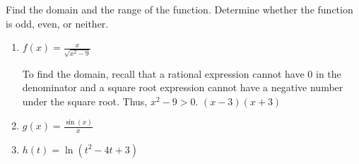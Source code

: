 \documentclass[nooutcomes, noinstructornotes]{ximera}
\begin{document}
\begin{problem}
Find the domain and the range of the function.  Determine whether the function is odd, even, or neither.

\begin{enumerate}
	\item $f(x)=\frac{x}{\sqrt{x^2-9}}$
		\begin{freeResponse}
			To find the domain, recall that a rational expression cannot have $0$ in the denominator and a square root expression cannot have a negative number under the square root.  Thus, $x^2-9>0$.
			$(x-3)(x+3)$
		\end{freeResponse}

	\item $g(x)= \frac{\sin(x)}{x}$
		\begin{freeResponse}

		\end{freeResponse}

	\item $h(t)= \ln(t^2-4t+3)$

		\begin{freeResponse}

		\end{freeResponse}

\end{enumerate}

\end{problem}
\end{document}
